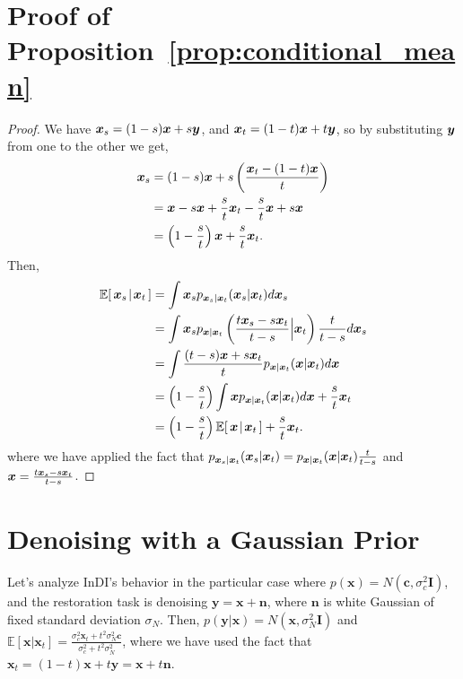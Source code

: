 \documentclass[10pt]{article} %
\begin{document}



\appendix

\section{Proof of Proposition~\ref{prop:conditional_mean}}
\label{app:proof_proposition_conditional_mean}
\begin{proof}
We have 
${\bm{x}}_s = (1-s) {\bm{x}} + s {\bm{y}}$, and  ${\bm{x}}_t = (1-t) {\bm{x}} + t {\bm{y}}$, so by substituting ${\bm{y}}$ from one to the other we get,
\begin{align}
{\bm{x}}_s &= (1-s) {\bm{x}} + s \left( \frac{{\bm{x}}_t  -(1-t){\bm{x}}}{t} \right) \\
      &= {\bm{x}} -s {\bm{x}} + \frac{s}{t}{\bm{x}}_t -\frac{s}{t}{\bm{x}}  + s{\bm{x}}  \\
      &= \left(1-\frac{s}{t} \right){\bm{x}}  + \frac{s}{t}{\bm{x}}_t. 
\end{align}
Then,
\begin{align}
\condExpec{\vx_s}{\vx_t} &= \int \vx_s p_{\vx_s | \vx_t}(\vx_s | \vx_t) d \vx_s \\
&=\int \vx_s p_{\vx | \vx_t} \left(\frac{t \vx_s - s \vx_t}{t-s} \Big | \vx_t\right) \frac{t}{t-s} d \vx_s \\
&=\int \frac{(t-s) \vx + s \vx_t}{t} p_{\vx | \vx_t} ( \vx | \vx_t) d\vx \\
&= \left(1-\frac{s}{t}\right) \int \vx p_{\vx | \vx_t} ( \vx | \vx_t) d\vx + \frac{s}{t} \vx_t \\%
&= \left(1 - \frac{s}{t}\right)  \condExpec{\vx}{\vx_t} + \frac{s}{t} \vx_t.
\end{align}
where we have applied the fact that $p_{{\bm{x}}_s | {\bm{x}}_t}({\bm{x}}_s | {\bm{x}}_t) = p_{{\bm{x}} | {\bm{x}}_t}({\bm{x}} | {\bm{x}}_t) \frac{t}{t-s}$ and ${\bm{x}} = \frac{t {\bm{x}}_s - s {\bm{x}}_t}{t-s}$.  
\end{proof}

\section{Denoising with a Gaussian Prior}
\label{app:gaussian_prior_denoising}
Let's analyze InDI's behavior in the particular case where $p(\textbf{x}) = N(\textbf{c}, \sigma^2_c \textbf{I})$, and the restoration task is denoising $\textbf{y} = \textbf{x} + \textbf{n}$, where $\textbf{n}$ is white Gaussian of fixed standard deviation $\sigma_N$.  Then, $p(\textbf{y} | \textbf{x}) = N(\textbf{x}, \sigma^2_N \textbf{I})$ and $\mathbb{E}[\textbf{x}|\textbf{x}_t]= \frac{\sigma^2_c \textbf{x}_t + t^2\sigma^2_N \textbf{c}}{\sigma^2_c + t^2\sigma^2_N}$,
where we have used the fact that $\textbf{x}_t = (1-t)\textbf{x} + t \textbf{y} = \textbf{x} + t\textbf{n}$. 
\end{document}
